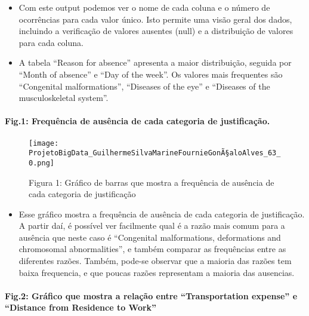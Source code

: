 \documentclass[11pt]{article}
\providecommand{\tightlist}{%
      \setlength{\itemsep}{0pt}\setlength{\parskip}{0pt}}
\begin{document}
    \begin{itemize}
\tightlist
\item
  Com este output podemos ver o nome de cada coluna e o número de
  ocorrências para cada valor único. Isto permite uma visão geral dos
  dados, incluindo a verificação de valores ausentes (null) e a
  distribuição de valores para cada coluna.
\item
  A tabela ``Reason for absence'' apresenta a maior distribuição,
  seguida por ``Month of absence'' e ``Day of the week''. Os valores
  mais frequentes são ``Congenital malformations'', ``Diseases of the
  eye'' e ``Diseases of the musculoskeletal system''.
\end{itemize}

\pagebreak

\paragraph{Fig.1: Frequência de ausência de cada categoria de justificação.}

\begin{figure}[h]
   \texttt{[image: ProjetoBigData\_GuilhermeSilvaMarineFournieGonÃ§aloAlves\_63\_0.png]}
   \pagebreak
    \caption{Figura 1: Gráfico de barras que mostra a frequência de ausência de cada categoria de justificação}
    \pagebreak
   \label{fig:barras1}
\end{figure}

    \begin{itemize}
\tightlist
\item
  Esse gráfico mostra a frequência de ausência de cada categoria de
  justificação. A partir daí, é possível ver facilmente qual é a razão
  mais comum para a ausência que neste caso é ``Congenital
  malformations, deformations and chromosomal abnormalities'', e também
  comparar as frequências entre as diferentes razões. Também, pode-se
  observar que a maioria das razões tem baixa frequencia, e que poucas
  razões representam a maioria das ausencias.
\end{itemize}

    \hypertarget{gruxe1fico-que-mostra-a-relauxe7uxe3o-entre-transportation-expense-e-distance-from-residence-to-work}{%
\paragraph{Fig.2: Gráfico que mostra a relação entre ``Transportation expense''
e ``Distance from Residence to
Work''}\label{gruxe1fico-que-mostra-a-relauxe7uxe3o-entre-transportation-expense-e-distance-from-residence-to-work}}
\end{document}
